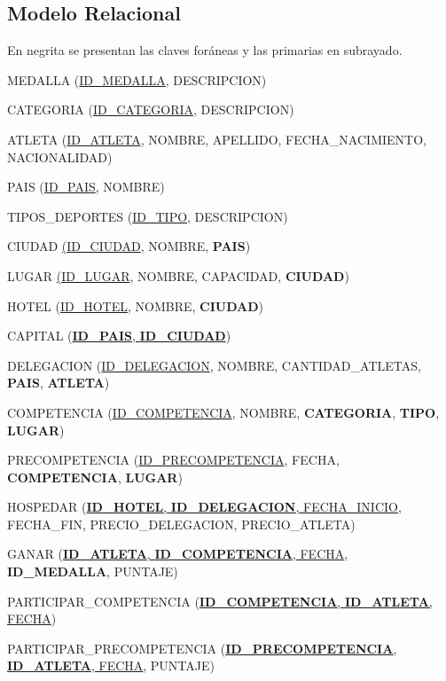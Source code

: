 \documentclass[12pt]{article}
\begin{document}
\newpage
\subsection{Modelo Relacional}
\label{sec:mr}
\begin{center}
    En negrita se presentan las claves foráneas y las primarias en subrayado.\smallskip
\end{center}\bigskip
{\scriptsize
\noindent
MEDALLA (\underline{ID\_MEDALLA}, DESCRIPCION)\bigskip

\noindent
CATEGORIA (\underline{ID\_CATEGORIA}, DESCRIPCION)\bigskip

\noindent
ATLETA (\underline{ID\_ATLETA}, NOMBRE, APELLIDO, FECHA\_NACIMIENTO, NACIONALIDAD)\bigskip

\noindent
PAIS (\underline{ID\_PAIS}, NOMBRE)\bigskip

\noindent
TIPOS\_DEPORTES (\underline{ID\_TIPO}, DESCRIPCION)\bigskip

\noindent
CIUDAD \underline{(ID\_CIUDAD}, NOMBRE, \textbf{PAIS})\bigskip

\noindent
LUGAR \underline{(ID\_LUGAR}, NOMBRE, CAPACIDAD, \textbf{CIUDAD})\bigskip

\noindent
HOTEL (\underline{ID\_HOTEL}, NOMBRE, \textbf{CIUDAD})\bigskip

\noindent
CAPITAL (\underline{\textbf{ID\_PAIS}, \textbf{ID\_CIUDAD}})\bigskip

\noindent
DELEGACION (\underline{ID\_DELEGACION}, NOMBRE, CANTIDAD\_ATLETAS, \textbf{PAIS}, \textbf{ATLETA})\bigskip

\noindent
COMPETENCIA (\underline{ID\_COMPETENCIA}, NOMBRE, \textbf{CATEGORIA}, \textbf{TIPO}, \textbf{LUGAR})\bigskip

\noindent
PRECOMPETENCIA (\underline{ID\_PRECOMPETENCIA}, FECHA, \textbf{COMPETENCIA}, \textbf{LUGAR})\bigskip

\noindent
HOSPEDAR (\underline{\textbf{ID\_HOTEL}, \textbf{ID\_DELEGACION}, FECHA\_INICIO}, FECHA\_FIN, PRECIO\_DELEGACION, PRECIO\_ATLETA)\bigskip

\noindent
GANAR (\underline{\textbf{ID\_ATLETA}, \textbf{ID\_COMPETENCIA}, FECHA}, \textbf{ID\_MEDALLA}, PUNTAJE)\bigskip

\noindent
PARTICIPAR\_COMPETENCIA (\underline{\textbf{ID\_COMPETENCIA}, \textbf{ID\_ATLETA}, FECHA})\bigskip

\noindent
PARTICIPAR\_PRECOMPETENCIA (\underline{\textbf{ID\_PRECOMPETENCIA}, \textbf{ID\_ATLETA}, FECHA}, PUNTAJE)
}
\end{document}
